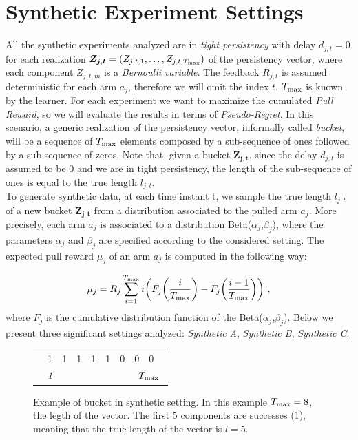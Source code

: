 \section{Synthetic Experiment Settings}
All the synthetic experiments analyzed are in \emph{tight persistency} with delay $d_{j,t}=0$ for each realization $\boldsymbol{Z_{j,t}} = (Z_{j,t,1},\dots,Z_{j,t,T_{\textnormal{max}}})$ of the persistency vector, where each component $Z_{j,t,m}$ is a \emph{Bernoulli variable}. The feedback $R_{j, t}$ is assumed deterministic for each arm $a_j$, therefore we will omit the index $t$. $T_{\textnormal{max}}$ is known by the learner. For each experiment we want to maximize the cumulated \emph{Pull Reward}, so we will evaluate the results in terms of \emph{Pseudo-Regret}. In this scenario, a generic realization of the persistency vector, informally called \emph{bucket}, will be a sequence of $T_{\textnormal{max}}$ elements composed by a sub-sequence of ones followed by a sub-sequence of zeros. Note that, given a bucket $\boldsymbol{Z_{j,t}}$, since the delay $d_{j,t}$ is assumed to be 0 and we are in tight persistency, the length of the sub-sequence of ones is equal to the true length $l_{j,t}$.\\
To generate synthetic data, at each time instant t, we sample the true length $l_{j,t}$ of a new bucket $\boldsymbol{Z_{j,t}}$ from a distribution associated to the pulled arm $a_j$. More precisely, each arm $a_j$ is associated to a distribution Beta($\alpha_j$,$\beta_j$), where the parameters $\alpha_j$ and $\beta_j$ are specified according to the considered setting. The expected pull reward $\mu_j$ of an arm $a_j$ is computed in the following way:

$$\mu_j = R_j\sum_{i=1}^{T_{\textnormal{max}}}i\bigg(F_j\bigg(\frac{i}{T_{\textnormal{max}}}\bigg)-F_j\bigg(\frac{i-1}{T_{\textnormal{max}}}\bigg)\bigg) \ ,$$
where $F_j$ is the cumulative distribution function of the Beta($\alpha_j$,$\beta_j$).
Below we present three significant settings analyzed: \emph{Synthetic A}, \emph{Synthetic B}, \emph{Synthetic C}.

\begin{figure}[t]
	\centering
	\begin{tabular}{llllllllll}
		\cline{2-9}
		\multicolumn{1}{l|}{} & \multicolumn{1}{l|}{1} & \multicolumn{1}{l|}{1} & \multicolumn{1}{l|}{1} & \multicolumn{1}{l|}{1} & \multicolumn{1}{l|}{1} & \multicolumn{1}{l|}{0} & \multicolumn{1}{l|}{0} & \multicolumn{1}{l|}{0} &  \\ \cline{2-9}
		& \textit{1}             & \textit{}              &                        &                        &                        &                        & \multicolumn{3}{c}{\textit{ $T_{\textnormal{max}}$}}                 
	\end{tabular}
	\caption{Example of bucket in synthetic setting. In this example $T_{\textnormal{max}}=8$, the legth of the vector. The first 5 components are successes (1), meaning that the true length of the vector is $l=5$.}
	\label{sbucket}
\end{figure}
